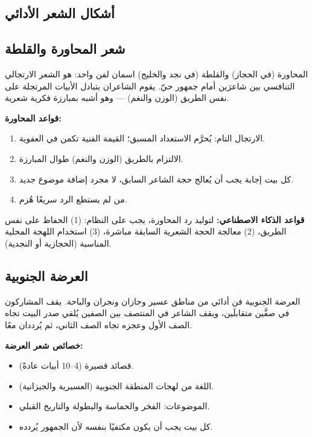 \begin{otherlanguage}{arabic}

\section*{أشكال الشعر الأدائي}

\subsection*{شعر المحاورة والقلطة}

المحاورة (في الحجاز) والقلطة (في نجد والخليج) اسمان لفن واحد: هو الشعر الارتجالي التنافسي بين شاعرَين أمام جمهور حيّ. يقوم الشاعران بتبادل الأبيات المرتجلة على نفس الطريق (الوزن والنغم) — وهو أشبه بمبارزة فكرية شعرية.

\textbf{قواعد المحاورة:}
\begin{enumerate}
  \item الارتجال التام: يُحرَّم الاستعداد المسبق؛ القيمة الفنية تكمن في العفوية.
  \item الالتزام بالطريق (الوزن والنغم) طوال المبارزة.
  \item كل بيت إجابة يجب أن يُعالج حجة الشاعر السابق، لا مجرد إضافة موضوع جديد.
  \item من لم يستطع الرد سريعًا هُزم.
\end{enumerate}

\textbf{قواعد الذكاء الاصطناعي:} لتوليد رد المحاورة، يجب على النظام: (1) الحفاظ على نفس الطريق، (2) معالجة الحجة الشعرية السابقة مباشرة، (3) استخدام اللهجة المحلية المناسبة (الحجازية أو النجدية).

\subsection*{العرضة الجنوبية}

العرضة الجنوبية فن أدائي من مناطق عسير وجازان ونجران والباحة. يقف المشاركون في صفَّين متقابلَين، ويقف الشاعر في المنتصف بين الصفين يُلقي صدر البيت تجاه الصف الأول وعجزه تجاه الصف الثاني، ثم يُرددان معًا.

\textbf{خصائص شعر العرضة:}
\begin{itemize}
  \item قصائد قصيرة (4–10 أبيات عادةً).
  \item اللغة من لهجات المنطقة الجنوبية (العسيرية والجيزانية).
  \item الموضوعات: الفخر والحماسة والبطولة والتاريخ القبلي.
  \item كل بيت يجب أن يكون مكتفيًا بنفسه لأن الجمهور يُردده.
\end{itemize}


\end{otherlanguage}
